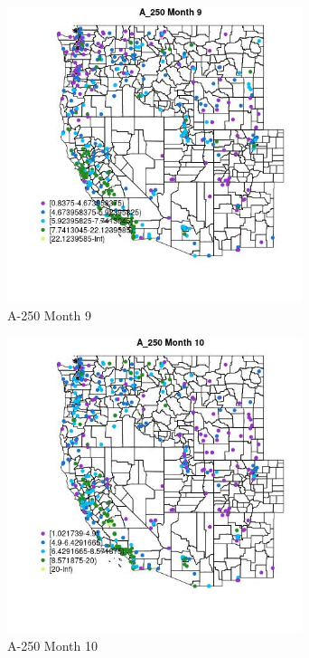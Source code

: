 \begin{figure} 
\centering  
\includegraphics[width=0.77\textwidth]{Code_Outputs/ML_input_report_ML_input_PM25_Step5_part_d_de_duplicated_aves_ML_input_MapObsMo9A_250.jpg} 
\caption{\label{fig:ML_input_report_ML_input_PM25_Step5_part_d_de_duplicated_aves_ML_inputMapObsMo9A_250}A-250 Month 9} 
\end{figure} 
 

\begin{figure} 
\centering  
\includegraphics[width=0.77\textwidth]{Code_Outputs/ML_input_report_ML_input_PM25_Step5_part_d_de_duplicated_aves_ML_input_MapObsMo10A_250.jpg} 
\caption{\label{fig:ML_input_report_ML_input_PM25_Step5_part_d_de_duplicated_aves_ML_inputMapObsMo10A_250}A-250 Month 10} 
\end{figure} 
 

